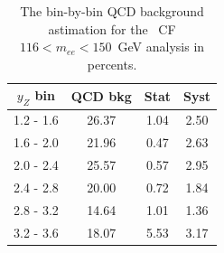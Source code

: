 \begin{table}
\centering
\begin{tabular}{ cccc } \hline \hline
 $y_Z$ bin & QCD bkg & Stat & Syst \\  \hline
 1.2 -  1.6 &  26.37 &   1.04  &   2.50 \\
 1.6 -  2.0 &  21.96 &   0.47  &   2.63 \\
 2.0 -  2.4 &  25.57 &   0.57  &   2.95 \\
 2.4 -  2.8 &  20.00 &   0.72  &   1.84 \\
 2.8 -  3.2 &  14.64 &   1.01  &   1.36 \\
 3.2 -  3.6 &  18.07 &   5.53  &   3.17 \\
\hline \hline
\end{tabular}
\caption{The bin-by-bin QCD background astimation for the \Zee\ CF $116 < m_{ee} < 150$~GeV analysis in percents.}
\label{tab:bkg_qcd_high_percents}
\end{table}
